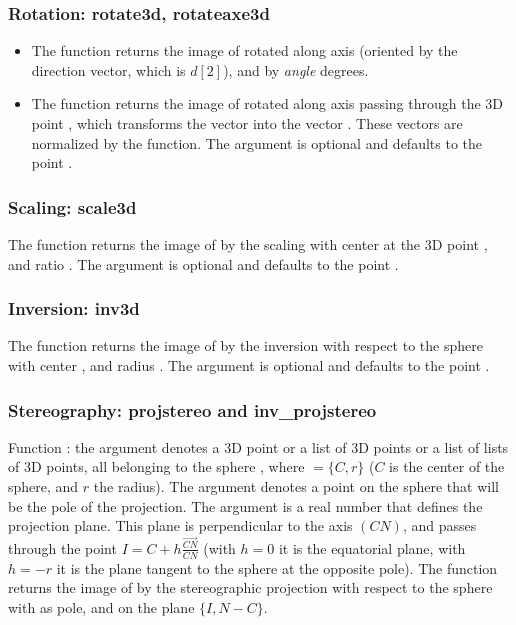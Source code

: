 \subsubsection{Rotation: rotate3d, rotateaxe3d}

\begin{itemize}
\item The function  returns the image of  rotated along axis  (oriented by the direction vector, which is $d[2]$), and by \emph{angle} degrees.

\item The function  returns the image of  rotated along axis passing through the 3D point , which transforms the vector  into the vector . These vectors are normalized by the function. The argument  is optional and defaults to the point .
\end{itemize}

\subsubsection{Scaling: scale3d}

The function  returns the image of  by the scaling with center at the 3D point , and ratio . The argument  is optional and defaults to the point .

\subsubsection{Inversion: inv3d}

The function  returns the image of  by the inversion with respect to the sphere with center , and radius . The argument  is optional and defaults to the point .

\subsubsection{Stereography: projstereo and inv\_projstereo}

Function : the argument  denotes a 3D point or a list of 3D points or a list of lists of 3D points, all belonging to the sphere , where $=\{C,r\}$ ($C$ is the center of the sphere, and $r$ the radius). The argument  denotes a point on the sphere that will be the pole of the projection. The argument  is a real number that defines the projection plane. This plane is perpendicular to the axis $(CN)$, and passes through the point $I=C+h \frac{\vec{CN}}{CN}$ (with $h=0$ it is the equatorial plane, with $h=-r$ it is the plane tangent to the sphere at the opposite pole). The function returns the image of  by the stereographic projection with respect to the sphere  with  as pole, and on the plane $\{I,N-C\}$.

